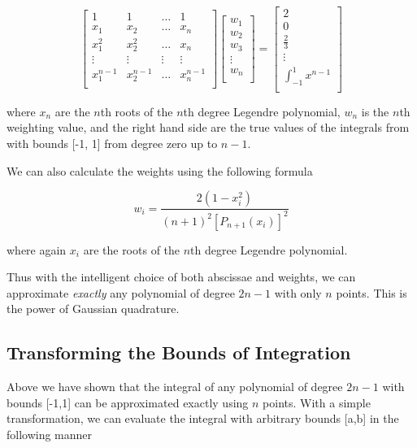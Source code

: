 \[
\begin{bmatrix}
1    & 1 &  \dots &1 \\
x_1      & x_2 &  \dots & x_n \\
x_1^2      & x_2^2 & \dots & x_n \\
\vdots & \vdots & \vdots & \vdots\\
x_1^{n-1}      & x_2^{n-1} & \dots & x_n^{n-1}\\
\end{bmatrix}
\begin{bmatrix}
w_1 \\
w_2 \\
w_3 \\
\vdots \\
w_n \\
\end{bmatrix}
=
\begin{bmatrix}
2  \\
0  \\
\frac{2}{3}  \\
\vdots \\
\int_{-1}^1 x^{n-1}  \\
\end{bmatrix}
\]

where $x_{n}$ are the $n$th roots of the $n$th degree Legendre polynomial, $w_n$ is the $n$th weighting value, and the right hand side are the true values of the integrals from with bounds [-1, 1] from degree zero up to $n-1$.

We can also calculate the weights using the following formula

\[ w_i = \frac{2(1-x_i^2)}{(n+1)^2 [P_{n+1}(x_i)]^2 } \]

where again $x_i$ are the roots of the $n$th degree Legendre polynomial.

Thus with the intelligent choice of both abscissae and weights, we can approximate \textit{exactly} any polynomial of degree $2n-1$ with only $n$ points. This is the power of Gaussian quadrature.

\subsection{Transforming the Bounds of Integration}

Above we have shown that the integral of any polynomial of degree $2n-1$ with bounds [-1,1] can be approximated exactly using $n$ points. With a simple transformation, we can evaluate the integral with arbitrary bounds [a,b] in the following manner 

